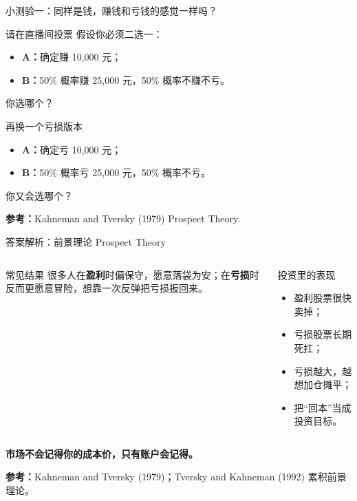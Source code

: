 \documentclass[UTF8,aspectratio=169,11pt]{ctexbeamer}
\newcommand{\source}[1]{\vfill{\scriptsize\color{aqgray}\textbf{参考：}#1}}
\begin{document}
\begin{frame}{小测验一：同样是钱，赚钱和亏钱的感觉一样吗？}
\begin{casebox}{请在直播间投票}
\small
假设你必须二选一：
\begin{itemize}
\item \textbf{A：}确定赚 10,000 元；
\item \textbf{B：}50\% 概率赚 25,000 元，50\% 概率不赚不亏。
\end{itemize}
你选哪个？
\end{casebox}
\vspace{0.2cm}
\begin{casebox}{再换一个亏损版本}
\small
\begin{itemize}
\item \textbf{A：}确定亏 10,000 元；
\item \textbf{B：}50\% 概率亏 25,000 元，50\% 概率不亏。
\end{itemize}
你又会选哪个？
\end{casebox}
\source{Kahneman and Tversky (1979) Prospect Theory.}
\end{frame}

\begin{frame}{答案解析：前景理论 Prospect Theory}
\begin{columns}[T,totalwidth=\textwidth]
\begin{keybox}{常见结果}
\small
很多人在\textbf{盈利}时偏保守，愿意落袋为安；在\textbf{亏损}时反而更愿意冒险，想靠一次反弹把亏损扳回来。
\end{keybox}
\begin{riskbox}{投资里的表现}
\small
\begin{itemize}
\item 盈利股票很快卖掉；
\item 亏损股票长期死扛；
\item 亏损越大，越想加仓摊平；
\item 把“回本”当成投资目标。
\end{itemize}
\end{riskbox}
\end{columns}
\vspace{0.25cm}
\begin{center}\Large \textbf{市场不会记得你的成本价，只有账户会记得。}\end{center}
\source{Kahneman and Tversky (1979)；Tversky and Kahneman (1992) 累积前景理论。}
\end{frame}
\end{document}
